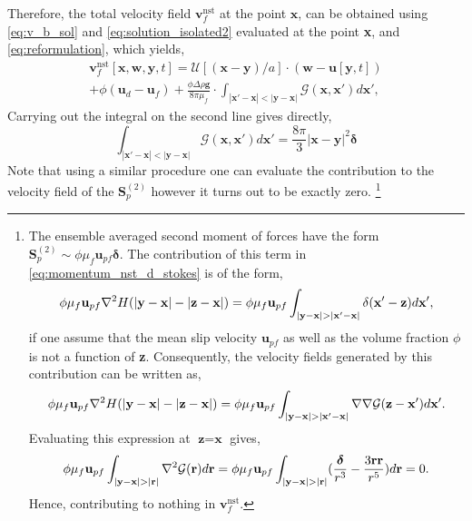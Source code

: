 Therefore, the total velocity field $\textbf{v}^\text{nst}_f$ at the point $\textbf{x}$, can be obtained using \ref{eq:v_b_sol} and \ref{eq:solution_isolated2} evaluated at the point \textbf{x}, and  \ref{eq:reformulation}, which yields,  
\begin{multline}
    \textbf{v}^\text{nst}_f [\textbf{x},\textbf{w},\textbf{y},t]
    =
    \mathcal{U}[(\textbf{x} - \textbf{y})/a]\cdot 
    (\textbf{w}- \textbf{u}[\textbf{y},t])
    \\
    +
    \phi(\textbf{u}_d - \textbf{u}_f)
    + 
    \frac{\phi\Delta \rho \textbf{g}}{8\pi \mu_f}\cdot 
    \int_{|\textbf{x}'-\textbf{x}|< |\textbf{y}- \textbf{x}|}
    \mathcal{G}(\textbf{x},\textbf{x}')
    d\textbf{x}',
\end{multline}
Carrying out the integral on the second line gives directly,
\begin{equation}
    \int_{|\textbf{x}'-\textbf{x}|< |\textbf{y}- \textbf{x}|}
    \mathcal{G}(\textbf{x},\textbf{x}')
    d\textbf{x}'
    = \frac{8\pi}{3}|\textbf{x}- \textbf{y}|^2\bm\delta
\end{equation}
Note that using a similar procedure one can evaluate the contribution to the velocity field of the $\textbf{S}_p^{(2)}$ however it turns out to be exactly zero.
\footnote{
    The ensemble averaged second moment of forces have the form $\textbf{S}_p^{(2)} \sim \phi \mu_f \textbf{u}_{pf} \bm\delta$. 
    The contribution of this term in \ref{eq:momentum_nst_d_stokes} is of the form, 
    \begin{equation*}
        \phi \mu_f \textbf{u}_{pf} \mathbf{\nabla}^2  H(|\textbf{y}- \textbf{x}| - |\textbf{z} -\textbf{x}|)
        =  \phi \mu_f \textbf{u}_{pf} \int_{|\textbf{y} - \textbf{x}| > |\textbf{x}' - \textbf{x}|}
        \delta(\textbf{x}'-\textbf{z})
        d\textbf{x}',
    \end{equation*}
    if one assume that the mean slip velocity $\textbf{u}_{pf}$ as well as the volume fraction $\phi$ is not a function of \textbf{z}. 
    Consequently, the velocity fields generated by this contribution can be written as, 
    \begin{equation*}
        \phi \mu_f \textbf{u}_{pf} \mathbf{\nabla}^2  H(|\textbf{y}- \textbf{x}| - |\textbf{z} -\textbf{x}|)
        =  \phi \mu_f \textbf{u}_{pf} \int_{|\textbf{y} - \textbf{x}| > |\textbf{x}' - \textbf{x}|}
        \mathbf{\nabla}\mathbf{\nabla}\mathcal{G}(\textbf{z} - \textbf{x}')
        d\textbf{x}'. 
    \end{equation*}     
    Evaluating this expression at $\textbf{z} = \textbf{x}$ gives, 
    \begin{equation*}
        \phi \mu_f \textbf{u}_{pf} \int_{|\textbf{y} - \textbf{x}| > |\textbf{r}|}
        \mathbf{\nabla}^2\mathcal{G}(\textbf{r})
        d\textbf{r} 
        = 
        \phi \mu_f \textbf{u}_{pf} \int_{|\textbf{y} - \textbf{x}| > |\textbf{r}|}
        (\frac{\bm\delta}{r^3} - \frac{3\textbf{rr}}{r^5})
        d\textbf{r} 
        = 0. 
    \end{equation*}     
    Hence, contributing to nothing in $\textbf{v}_f^\text{nst}$.
} 

